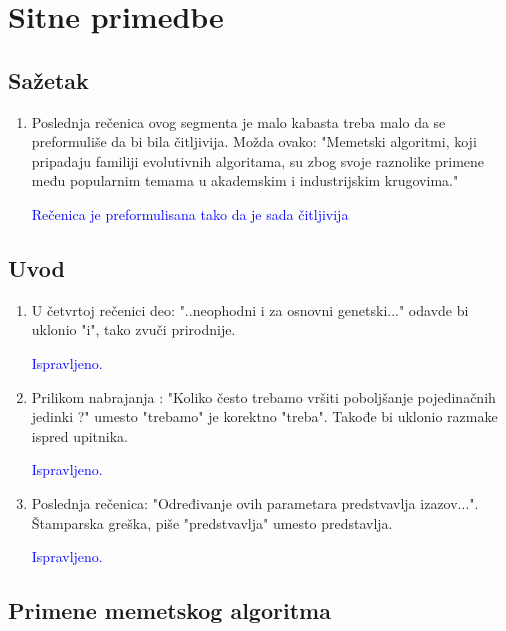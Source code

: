 \documentclass[a4paper]{report}
\newcommand{\odgovor}[1]{\textcolor{blue}{#1}}
\begin{document}
\section{Sitne primedbe}

\subsection{Sažetak}
\begin{enumerate}
  \item Poslednja rečenica ovog segmenta je malo kabasta treba malo da se preformuliše da bi bila čitljivija. Možda ovako: "Memetski algoritmi, koji pripadaju familiji evolutivnih algoritama, su zbog svoje raznolike primene među popularnim temama u akademskim i industrijskim krugovima."
  
  \odgovor{Rečenica je preformulisana tako da je sada čitljivija}
  
  
\end{enumerate}

\subsection{Uvod}
\begin{enumerate}
  \item U četvrtoj rečenici deo:  "..neophodni i za osnovni genetski..."  odavde bi uklonio "i", tako zvuči prirodnije.
  
  \odgovor{Ispravljeno.}
  
  \item Prilikom nabrajanja : "Koliko često trebamo vršiti poboljšanje pojedinačnih jedinki ?" umesto "trebamo" je korektno "treba". Takođe bi uklonio razmake ispred upitnika.
  
  \odgovor{Ispravljeno.}
  
  \item Poslednja rečenica: "Određivanje ovih parametara predstvavlja izazov...". Štamparska greška, piše "predstvavlja" umesto predstavlja.
  
  \odgovor{Ispravljeno.}
  
\end{enumerate}

\subsection{Primene memetskog algoritma}
\end{document}
